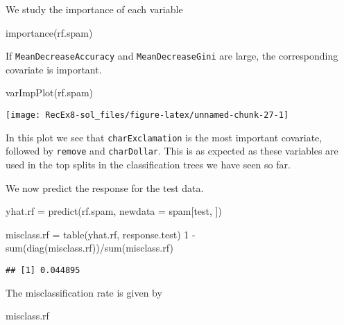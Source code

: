 \documentclass[
]{article}
\newenvironment{Shaded}{\begin{snugshade}}{\end{snugshade}}
\newcommand{\AttributeTok}[1]{\textcolor[rgb]{0.77,0.63,0.00}{#1}}
\newcommand{\DecValTok}[1]{\textcolor[rgb]{0.00,0.00,0.81}{#1}}
\newcommand{\FunctionTok}[1]{\textcolor[rgb]{0.00,0.00,0.00}{#1}}
\newcommand{\NormalTok}[1]{#1}
\newcommand{\OtherTok}[1]{\textcolor[rgb]{0.56,0.35,0.01}{#1}}
\newcommand{\SpecialCharTok}[1]{\textcolor[rgb]{0.00,0.00,0.00}{#1}}
\begin{document}
We study the importance of each variable

\begin{Shaded}
\begin{Highlighting}[]
\FunctionTok{importance}\NormalTok{(rf.spam)}
\end{Highlighting}
\end{Shaded}

If \texttt{MeanDecreaseAccuracy} and \texttt{MeanDecreaseGini} are
large, the corresponding covariate is important.

\begin{Shaded}
\begin{Highlighting}[]
\FunctionTok{varImpPlot}\NormalTok{(rf.spam)}
\end{Highlighting}
\end{Shaded}

\texttt{[image: RecEx8-sol\_files/figure-latex/unnamed-chunk-27-1]}

In this plot we see that \texttt{charExclamation} is the most important
covariate, followed by \texttt{remove} and \texttt{charDollar}. This is
as expected as these variables are used in the top splits in the
classification trees we have seen so far.

We now predict the response for the test data.

\begin{Shaded}
\begin{Highlighting}[]
\NormalTok{yhat.rf }\OtherTok{=} \FunctionTok{predict}\NormalTok{(rf.spam, }\AttributeTok{newdata =}\NormalTok{ spam[test, ])}

\NormalTok{misclass.rf }\OtherTok{=} \FunctionTok{table}\NormalTok{(yhat.rf, response.test)}
\DecValTok{1} \SpecialCharTok{{-}} \FunctionTok{sum}\NormalTok{(}\FunctionTok{diag}\NormalTok{(misclass.rf))}\SpecialCharTok{/}\FunctionTok{sum}\NormalTok{(misclass.rf)}
\end{Highlighting}
\end{Shaded}

\begin{verbatim}
## [1] 0.044895
\end{verbatim}

The misclassification rate is given by

\begin{Shaded}
\begin{Highlighting}[]
\NormalTok{misclass.rf}
\end{Highlighting}
\end{Shaded}
\end{document}
